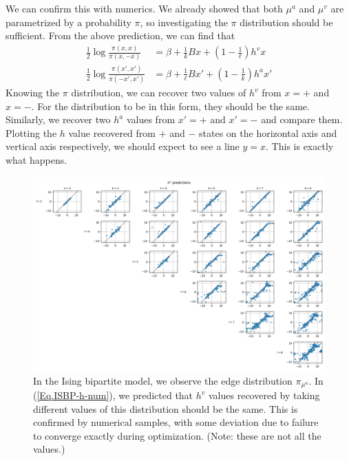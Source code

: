 \documentclass[12pt]{article}
\numberwithin{equation}{section}
\begin{document}
We can confirm this with numerics. We already showed that both $\mu^a$ and $\mu^v$ are parametrized by a probability $\pi$, so investigating the
$\pi$ distribution should be sufficient. From the above prediction, we can find that
\begin{equation}
    \begin{aligned}
        \frac12\log\frac{\pi(x, x)}{\pi(x, -x)}     & = \beta + \frac1kBx + \left(1 - \frac1\ell\right)h^v x     \\
        \frac12\log\frac{\pi(x', x')}{\pi(-x', x')} & = \beta + \frac1\ell Bx' + \left(1 - \frac1k\right) h^a x'
    \end{aligned}
    \label{Eq.ISBP-h-num}
\end{equation}
Knowing the $\pi$ distribution, we can recover two values of $h^v$ from $x=+$ and $x=-$. For the distribution to be in this form, they should be the same. Similarly, we recover two $h^a$ values from $x'=+$ and $x'=-$ and compare them. Plotting the $h$ value recovered from $+$ and $-$ states on the
horizontal axis and vertical axis respectively, we should expect to see a line $y=x$. This is exactly what happens.
\begin{figure}[h]
    \centering
    \includegraphics[width=16cm]{img/Ising_bptt/hv_pred.png}
    \caption{In the Ising bipartite model, we observe the edge distribution $\pi_{\mu^a}$. In (\ref{Eq.ISBP-h-num}), we predicted that $h^v$ values
        recovered by taking different values of this distribution should be the same. This is confirmed by numerical samples, with some
        deviation due to failure to converge exactly during optimization. (Note: these are not all the values.)}
    \label{Fig.ISBP-hv-guess}
\end{figure}
\end{document}
